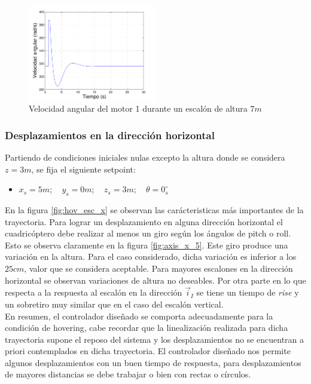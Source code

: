 \documentclass[main]{subfiles}
\begin{document}
\begin{figure}
  \centering
	\includegraphics[width=0.5\textwidth]{./pics_test_control/hov/w_z_7.pdf}
  \caption{Velocidad angular del motor 1 durante un escal\'on de altura $7m$}
  \label{fig:w_z_7}
\end{figure}


\subsubsection{Desplazamientos en la direcci\'on horizontal}
Partiendo de condiciones iniciales nulas excepto la altura donde se considera $z = 3 m$, se fija el siguiente setpoint:
\begin{itemize}
\item ${x_s = 5 m;\quad y_s = 0 m;\quad z_s = 3 m;\quad \theta = 0_s^\circ}$
\end{itemize}

En la figura \ref{fig:hov_esc_x} se observan las car\'acteristicas m\'as importantes de la trayectoria. Para lograr un desplazamiento en alguna direcci\'on horizontal el cuadric\'optero debe realizar al menos un giro seg\'un los \'angulos de pitch o roll. Esto se observa claramente en la figura \ref{fig:axis_x_5}. Este giro produce una variaci\'on en la altura. Para el caso considerado, dicha variaci\'on es inferior a los $25cm$, valor que se considera aceptable. Para mayores escalones en la direcci\'on horizontal se observan variaciones de altura no deseables. Por otra parte en lo que respecta a la respuesta al escal\'on en la direcci\'on $\vec{i}_I$ se tiene un tiempo de \emph{rise} y un sobretiro muy similar que en el caso del escal\'on vertical.\\

En resumen, el controlador diseñado se comporta adecuadamente para la condici\'on de hovering, cabe recordar que la linealizaci\'on realizada para dicha trayectoria supone el reposo del sistema y los desplazamientos no se encuentran a priori contemplados en dicha trayectoria. El controlador diseñado nos permite algunos desplazamientos con un buen tiempo de respuesta, para desplazamientos de mayores distancias se debe trabajar o bien con rectas o c\'irculos. 
\end{document}

